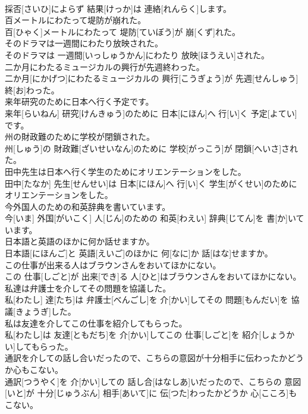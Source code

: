\documentclass[8pt]{extreport}
\begin{document}
\begin{CJK}{UTF8}{min}
\\	採否[さいひ]によらず 結果[けっか]は 連絡[れんらく]します。
\\	百メートルにわたって堤防が崩れた。	
\\	百[ひゃく]メートルにわたって 堤防[ていぼう]が 崩[くず]れた。
\\	そのドラマは一週間にわたり放映された。	
\\	そのドラマは 一週間[いっしゅうかん]にわたり 放映[ほうえい]された。
\\	二か月にわたるミュージカルの興行が先週終わった。	
\\	二か月[にかげつ]にわたるミュージカルの 興行[こうぎょう]が 先週[せんしゅう] 終[お]わった。
\\	来年研究のために日本へ行く予定です。	
\\	来年[らいねん] 研究[けんきゅう]のために 日本[にほん]へ 行[い]く 予定[よてい]です。
\\	州の財政難のために学校が閉鎖された。	
\\	州[しゅう]の 財政難[ざいせいなん]のために 学校[がっこう]が 閉鎖[へいさ]された。
\\	田中先生は日本へ行く学生のためにオリエンテーションをした。	
\\	田中[たなか] 先生[せんせい]は 日本[にほん]へ 行[い]く 学生[がくせい]のためにオリエンテーションをした。
\\	今外国人のための和英辞典を書いています。	
\\	今[いま] 外国[がいこく] 人[じん]のための 和英[わえい] 辞典[じてん]を 書[か]いています。
\\	日本語と英語のほかに何か話せますか。	
\\	日本語[にほんご]と 英語[えいご]のほかに 何[なに]か 話[はな]せますか。
\\	この仕事が出来る人はブラウンさんをおいてほかにない。	
\\	この 仕事[しごと]が 出来[でき]る 人[ひと]はブラウンさんをおいてほかにない。
\\	私達は弁護士を介してその問題を協議した。	
\\	私[わたし] 達[たち]は 弁護士[べんごし]を 介[かい]してその 問題[もんだい]を 協議[きょうぎ]した。
\\	私は友達を介してこの仕事を紹介してもらった。	
\\	私[わたし]は 友達[ともだち]を 介[かい]してこの 仕事[しごと]を 紹介[しょうかい]してもらった。
\\	通訳を介しての話し合いだったので、こちらの意図が十分相手に伝わったかどうか心もこない。	
\\	通訳[つうやく]を 介[かい]しての 話し合[はなしあ]いだったので、こちらの 意図[いと]が 十分[じゅうぶん] 相手[あいて]に 伝[つた]わったかどうか 心[こころ]もこない。

\end{CJK}
\end{document}
